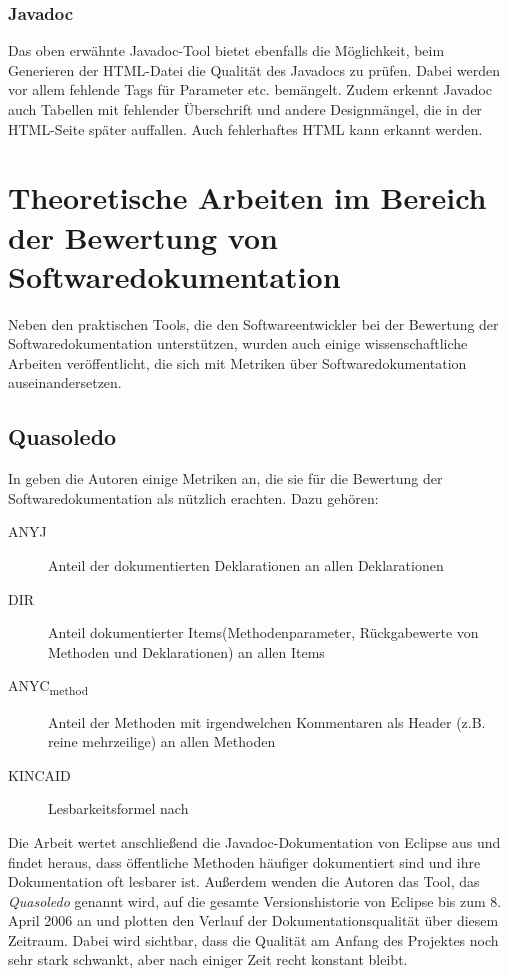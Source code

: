 \subsubsection{Javadoc}
Das oben erwähnte Javadoc-Tool bietet ebenfalls die Möglichkeit, beim Generieren der HTML-Datei die Qualität des Javadocs zu prüfen. Dabei werden vor allem fehlende Tags für Parameter etc. bemängelt. Zudem erkennt Javadoc auch Tabellen mit fehlender Überschrift und andere Designmängel, die in der HTML-Seite später auffallen. Auch fehlerhaftes HTML kann erkannt werden.

\section{Theoretische Arbeiten im Bereich der Bewertung von Softwaredokumentation}

Neben den praktischen Tools, die den Softwareentwickler bei der Bewertung der Softwaredokumentation unterstützen, wurden auch einige wissenschaftliche Arbeiten veröffentlicht, die sich mit Metriken über Softwaredokumentation auseinandersetzen. 


\subsection{Quasoledo}
In \cite[S. 4-10]{HowDocumentationEvolvesoverTime} geben die Autoren einige Metriken an, die sie für die Bewertung der Softwaredokumentation als nützlich erachten. Dazu gehören:
\begin{description}
    \item[ANYJ] Anteil der dokumentierten Deklarationen an allen Deklarationen
    \item[DIR] Anteil dokumentierter Items(Methodenparameter, Rückgabewerte von Methoden und Deklarationen) an allen Items
    \item[ANYC\textsubscript{method}] Anteil der Methoden mit irgendwelchen Kommentaren als Header (z.B. reine mehrzeilige) an allen Methoden
    \item[KINCAID] Lesbarkeitsformel nach \cite[S. 50]{ThePrinciplesofReadability}
\end{description}
Die Arbeit wertet anschließend die Javadoc-Dokumentation von Eclipse aus und findet heraus, dass öffentliche Methoden häufiger dokumentiert sind und ihre Dokumentation oft lesbarer ist. Außerdem wenden die Autoren das Tool, das \textit{Quasoledo} genannt wird, auf die gesamte Versionshistorie von Eclipse bis zum 8. April 2006 an und plotten den Verlauf der Dokumentationsqualität über diesem Zeitraum. Dabei wird sichtbar, dass die Qualität am Anfang des Projektes noch sehr stark schwankt, aber nach einiger Zeit recht konstant bleibt. 
